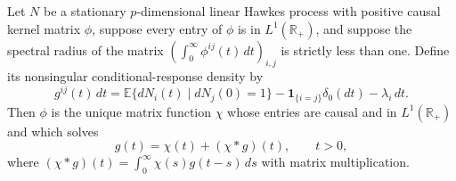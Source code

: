 Let \(N\) be a stationary \(p\)-dimensional linear Hawkes process with positive causal kernel matrix \(\phi\), suppose every entry of \(\phi\) is in \(L^1(\mathbb R_+)\), and suppose the spectral radius of the matrix \((\int_0^\infty\phi^{ij}(t)\,dt)_{i,j}\) is strictly less than one.  Define its nonsingular conditional-response density by
\[
 g^{ij}(t)\,dt
 =\mathbb E\{dN_i(t)\mid dN_j(0)=1\}
  -\mathbf 1_{\{i=j\}}\delta_0(dt)-\lambda_i\,dt.
\]
Then \(\phi\) is the unique matrix function \(\chi\) whose entries are causal and in \(L^1(\mathbb R_+)\) and which solves
\[
 g(t)=\chi(t)+(\chi*g)(t),\qquad t>0,
\]
where \((\chi*g)(t)=\int_0^\infty\chi(s)g(t-s)\,ds\) with matrix multiplication.
